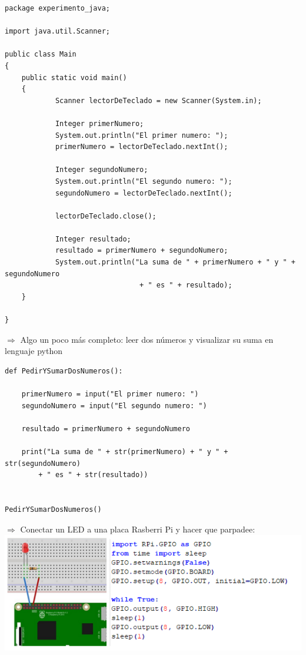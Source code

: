 \documentclass[spanish,12pt,a4paper,final,oneside]{book}
\begin{document}
\begin{lstlisting}[frame=single]
package experimento_java;
 
import java.util.Scanner;
 
public class Main
{
   	public static void main()
   	{
         	Scanner lectorDeTeclado = new Scanner(System.in);
         	
         	Integer primerNumero;
         	System.out.println("El primer numero: ");
         	primerNumero = lectorDeTeclado.nextInt();
   	
         	Integer segundoNumero;
         	System.out.println("El segundo numero: ");
         	segundoNumero = lectorDeTeclado.nextInt();
         	
         	lectorDeTeclado.close();
         	
         	Integer resultado;
         	resultado = primerNumero + segundoNumero;
         	System.out.println("La suma de " + primerNumero + " y " + segundoNumero
                            	+ " es " + resultado);
   	}
   	
}
\end{lstlisting}
$\Rightarrow$ Algo un poco más completo: leer dos números y visualizar su suma en lenguaje python
\begin{lstlisting}[frame=single]
def PedirYSumarDosNumeros():
 
    primerNumero = input("El primer numero: ")
    segundoNumero = input("El segundo numero: ")
 
	resultado = primerNumero + segundoNumero
 
	print("La suma de " + str(primerNumero) + " y " + str(segundoNumero)
      	+ " es " + str(resultado))
 
 
PedirYSumarDosNumeros()
\end{lstlisting}

$\Rightarrow$ Conectar un LED a una placa Rasberri Pi y hacer que parpadee:
\\
\includegraphics[width=\textwidth]{Conectar un led a una RaspberriPi}   
\end{document}
